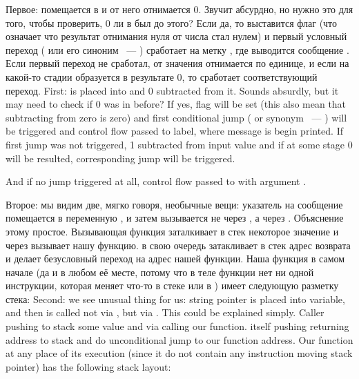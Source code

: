 \IFRU
{Первое:  помещается в \EAX и от него отнимается 0. Звучит абсурдно, но нужно это для того, чтобы проверить, 
0 ли в \EAX был до этого? Если да, то выставится флаг \ZF (что означает что результат отнимания нуля от числа 
стал нулем) и первый условный переход \JE ( или его синоним \JZ ~--- ) 
сработает на метку , где выводится сообщение .
Если первый переход не сработал, от значения отнимается по единице, 
и если на какой-то стадии образуется в результате $0$, то сработает соответствующий переход.}
{First:  is placed into \EAX and $0$ subtracted from it. Sounds absurdly, but it may need to check if 
0 was in \EAX before? If yes, flag \ZF will be set (this also mean that subtracting from zero is zero) 
and first conditional jump \JE ( or synonym \JZ ~--- ) will be triggered 
and control flow passed to  label, where  message is begin printed. 
If first jump was not triggered, 1 subtracted from input value and if at some stage 0 will be resulted, 
corresponding jump will be triggered.}

{And if no jump triggered at all, control flow passed to \printf with argument .}

\label{jump_to_last_printf}
\index{\Stack}
\IFRU
{Второе: мы видим две, мягко говоря, необычные вещи: указатель на сообщение помещается в переменную , 
и затем \printf вызывается не через \CALL, а через \JMP. Объяснение этому простое. 
Вызывающая функция заталкивает в стек некоторое значение и через \CALL вызывает нашу функцию. 
\CALL в свою очередь затакливает в стек адрес возврата и делает безусловный переход на адрес нашей функции. 
Наша функция в самом начале (да и в любом её месте, потому что в теле функции нет ни одной инструкции, 
которая меняет что-то в стеке или в \ESP) имеет следующую разметку стека:}
{Second: we see unusual thing for us: string pointer is placed into  variable, and 
then \printf is called not via \CALL, but via \JMP. This could be explained simply. 
Caller pushing to stack some value and via \CALL calling our function. 
\CALL itself pushing returning address to stack and do unconditional jump to our function address. 
Our function at any place of its execution (since it do not contain any instruction moving stack 
pointer) has the following stack layout:}


